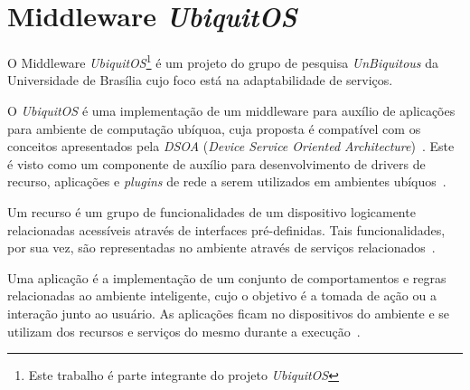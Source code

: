 \section{Middleware \textit{UbiquitOS}}
\label{uos}

	O Middleware \textit{UbiquitOS}\footnote{Este trabalho é parte integrante do projeto \textit{UbiquitOS}} é um projeto do grupo de pesquisa \textit{UnBiquitous} da Universidade de Brasília cujo foco está na adaptabilidade de serviços.

	O \textit{UbiquitOS} é uma implementação de um middleware para auxílio de aplicações para ambiente de computação ubíquoa, cuja proposta é compatível com os conceitos apresentados pela \textit{DSOA} (\textit{Device Service Oriented Architecture})~\cite{fabriciobuzzeto}. Este é visto como um componente de auxílio para desenvolvimento de drivers de recurso, aplicações e \textit{plugins} de rede a serem utilizados em ambientes ubíquos~\cite{fabriciobuzzeto}.

	Um recurso é um grupo de funcionalidades de um dispositivo logicamente relacionadas acessíveis através de interfaces pré-definidas. Tais funcionalidades, por sua vez, são representadas no ambiente através de serviços relacionados~\cite{fabriciobuzzeto}.

	Uma aplicação é a implementação de um conjunto de comportamentos e regras relacionadas ao ambiente inteligente, cujo o objetivo é a tomada de ação ou a interação junto ao usuário. As aplicações ficam no dispositivos do ambiente e se utilizam dos recursos e serviços do mesmo durante a execução~\cite{fabriciobuzzeto}.

